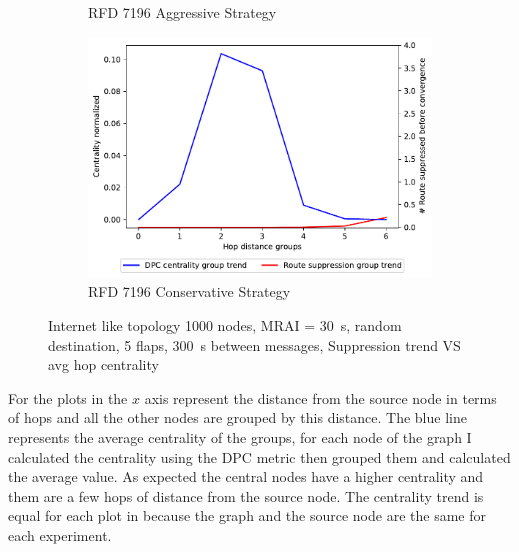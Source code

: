 \begin{figure}[h]
\begin{subfigure}[b]{0.325\textwidth}
         \caption{RFD 7196 Aggressive Strategy}
         \label{fig:1000_7196RFDA_centVSsup}
     \end{subfigure}
     \hfill
     \begin{subfigure}[b]{0.325\textwidth}
         \centering
         \includegraphics[width=\textwidth]{images/RFD/miceVSelephants/mice/cisco_1000_RFD_7196_conservative_nodeConvergence_centVSsup_trend.pdf}
         \caption{RFD 7196 Conservative Strategy}
         \label{fig:1000_7196RFDC_centVSsup}
     \end{subfigure}
		\caption{Internet like topology \num{1000} nodes, \ac{MRAI} = \SI{30}{\second}, random destination, \num{5} flaps, \SI{300}{\second} between messages, Suppression trend VS avg hop centrality}
        \label{fig:1000_RFD_centVSsup}
\end{figure}

For the plots in  the $x$ axis represent the distance
from the source node in terms of hops and all the other nodes are grouped by this
distance.
The blue line represents the average centrality of the groups, for each node of the
graph I calculated the centrality using the \ac{DPC} metric then grouped them
and calculated the average value.
As expected the central nodes have a higher centrality and them are a few hops
of distance
from the source node.
The centrality trend is equal for each plot in 
because the graph and the source node are the same for each experiment.

